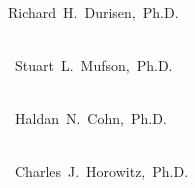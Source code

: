 \documentclass[letterpaper,11pt]{article}
\begin{document}
\begin{spacing}{1}
\noindent
\hbox{\hspace{2.5in} \underbar{\hbox{\hspace{3.25in}}}} \\
\hbox{\hspace{2.5in}Richard H. Durisen, Ph.D.}

\vspace{0.5in}

\noindent
\hbox{\hspace{2.5in} \underbar{\hbox{\hspace{3.25in}}}} \\
\hbox{\hspace{2.5in} Stuart L. Mufson, Ph.D.}

\vspace{0.5in}

\noindent
\hbox{\hspace{2.5in} \underbar{\hbox{\hspace{3.25in}}}} \\
\hbox{\hspace{2.5in} Haldan N. Cohn, Ph.D.}

\vspace{0.5in}

\noindent
\hbox{\hspace{2.5in} \underbar{\hbox{\hspace{3.25in}}}} \\
\hbox{\hspace{2.5in} Charles J. Horowitz, Ph.D.}
\end{spacing}
\end{document}
